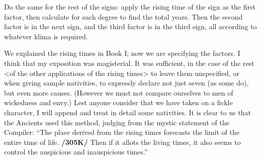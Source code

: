 Do the same for the rest of the signs: apply the rising time of the sign as the first factor, then calculate for each degree to find the total years. Then the second factor is in the next sign, and the third factor is in
the third sign, all according to whatever klima is required.

We explained the rising times in Book I; now we are specifying the factors. I think that my exposition was magisterial. It was sufficient, in the case of the rest <of the other applications of the rising
times> to leave them unspecified, or when giving sample nativities, to expressly declare not just seven (as some do), but even more causes. (However we must not compare ourselves to men of wickedness and envy.) Lest anyone consider that we have taken on a fickle character, I will append and treat in detail some nativities. It is clear to us that the Ancients used this method, judging from the mystic statement of the Compiler: “The place derived from the rising times forecasts the limit of the entire time of life. \textbf{/305K/} Then if it allots the living times, it also seems to control the auspicious and inauspicious times.”

\newpage